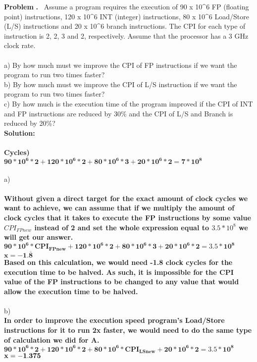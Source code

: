 \documentclass[11pt]{article}
\newcounter{problem}
\newcounter{solution}
\newcommand\Problem{%
	\stepcounter{problem}%
	\textbf{\theproblem.}~%
	\setcounter{solution}{0}%
}
\newcommand\TheSolution{%
	\textbf{Solution:}\\%
}
\begin{document}
	
	\textbf{Problem}
	\Problem Assume a program requires the execution of 90 x 10\^{}6 FP (floating point) instructions, 120 x 10\^{}6 INT (integer) instructions, 80 x 10\^{}6 Load/Store (L/S) instructions and 20 x 10\^{}6 branch instructions. The CPI for each type of instruction is 2, 2, 3 and 2, respectively. Assume that the processor has a 3 GHz clock rate. 
\\
\\
	a) By how much must we improve the CPI of FP instructions if we want the program to run two times faster?
	\\
	b) By how much must we improve the CPI of L/S instruction if we want the program to run two times faster?
	\\
	c) By how much is the execution time of the program improved if the CPI of INT and FP instructions are
	reduced by 30\% and the CPI of L/S and Branch is reduced by 20\%?
	\\
	\TheSolution 
	\\
	\textbf{Cycles)} \\
	$\mathbf{90*10^6*2 + 120*10^6*2 + 80*10^6 * 3 +20*10^6*2 = 7*10^8}$
	\\
	\\
	a) \\
		\\
	\textbf{Without given a direct target for the exact amount of clock cycles we want to achieve, we can assume that if we multiply the amount of clock cycles that it takes to execute the FP instructions by some value $CPI_{FPnew}$ instead of 2 and set the whole expression equal to $3.5*10^8$ we will get our answer. }\\
	$\mathbf{90*10^6*CPI_{FPnew} + 120*10^6*2 + 80*10^6 * 3 +20*10^6*2 = 3.5*10^8}$
	$\mathbf{x = -1.\overline{8}}$\\
	\textbf{Based on this calculation, we would need -1.8 clock cycles for the execution time to be halved. As such, it is impossible for the CPI value of the FP instructions to be changed to any value that would allow the execution time to be halved.}
	\\
	\\
	b)\\
	\textbf{In order to improve the execution speed program's Load/Store instructions for it to run 2x faster, we would need to do the same type of calculation we did for A.}\\
	$\mathbf{90*10^6*2 + 120*10^6*2 + 80*10^6 * CPI_{LSnew} +20*10^6*2 = 3.5*10^8}$\\
	$\mathbf{x = -1.375}\\$
\end{document}
